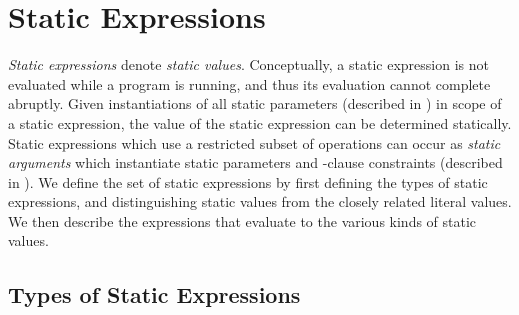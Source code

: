 %
%
%
%

\section{Static Expressions}


\emph{Static expressions} denote \emph{static values}.  Conceptually,
a static expression is not evaluated while a program is running, and
thus its evaluation
cannot complete abruptly.  Given instantiations of all static
parameters (described in ) in scope of a
static expression, the value of the static expression can be
determined statically.  Static expressions which use a restricted subset of operations can occur as
\emph{static arguments} which instantiate static parameters and
-clause constraints (described in ).
We define the set of static
expressions by first defining the types of static expressions, and
distinguishing static values from the closely related literal values.
We then describe the expressions that evaluate to the various kinds of
static values.


\subsection{Types of Static Expressions}

